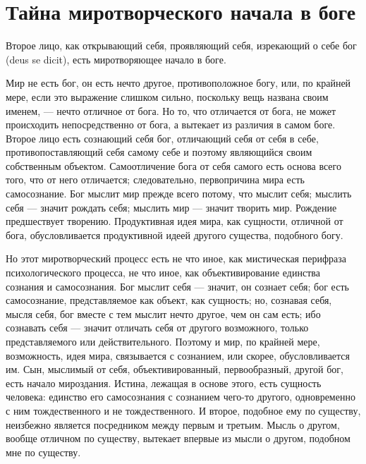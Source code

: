 \documentclass[12pt,oneside]{book}
\begin{document}
\chapter{Тайна миротворческого начала в боге}


Второе лицо, как открывающий себя, проявляющий себя, изрекающий о себе бог (deus se dicit), есть миротворяющее начало в боге.

Мир не есть бог, он есть нечто другое, противоположное богу, или, по крайней мере, если это выражение слишком сильно, поскольку вещь названа своим именем, --- нечто отличное от бога. Но то, что отличается от бога, не может происходить непосредственно от бога, а вытекает из различия в самом боге. Второе лицо есть сознающий себя бог, отличающий себя от себя в себе, противопоставляющий себя самому себе и поэтому являющийся своим собственным объектом. Самоотличение бога от себя самого есть основа всего того, что от него отличается; следовательно, первопричина мира есть самосознание. Бог мыслит мир прежде всего потому, что мыслит себя; мыслить себя --- значит рождать себя; мыслить мир --- значит творить мир. Рождение предшествует творению. Продуктивная идея мира, как сущности, отличной от бога, обусловливается продуктивной идеей другого существа, подобного богу.

Но этот миротворческий процесс есть не что иное, как мистическая перифраза психологического процесса, не что иное, как объективирование единства сознания и самосознания. Бог мыслит себя --- значит, он сознает себя; бог есть самосознание, представляемое как объект, как сущность; но, сознавая себя, мысля себя, бог вместе с тем мыслит нечто другое, чем он сам есть; ибо сознавать себя --- значит отличать себя от другого возможного, только представляемого или действительного. Поэтому и мир, по крайней мере, возможность, идея мира, связывается с сознанием, или скорее, обусловливается им. Сын, мыслимый от себя, объективированный, первообразный, другой бог, есть начало мироздания. Истина, лежащая в основе этого, есть сущность человека: единство его самосознания с сознанием чего-то другого, одновременно с ним тождественного и не тождественного. И второе, подобное ему по существу, неизбежно является посредником между первым и третьим. Мысль о другом, вообще отличном по существу, вытекает впервые из мысли о другом, подобном мне по существу.
\end{document}
